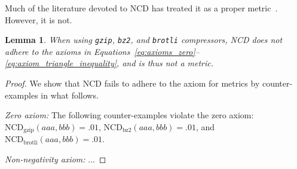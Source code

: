 \documentclass[preprint,12pt]{article}
\newtheorem{lemma}{Lemma}
\begin{document}

Much of the literature devoted to NCD has treated it as a proper metric~\cite{opitz2023gzip,weinreich2023parameter,nishida2011tweet,jiang2022less}. However, it is not.
\begin{lemma}
    When using \texttt{gzip}, \texttt{bz2}, and \texttt{brotli} compressors, NCD does not adhere to the axioms in Equations~\ref{eq:axioms_zero}--\ref{eq:axiom_triangle_inequality}, and is thus not a metric.
\end{lemma}
\begin{proof}
    We show that NCD fails to adhere to the axiom for metrics by counter-examples in what follows.

    \vspace{0.5em}
    \noindent%
    \textit{Zero axiom:} The following counter-examples violate the zero axiom:
    $\text{NCD}_{\text{gzip}}(aaa, bbb) = .01$, $\text{NCD}_{\text{bz2}}(aaa, bbb) = .01 $, and $\text{NCD}_{\text{brotli}}(aaa, bbb) = .01$.

    \vspace{0.5em}
    \noindent%
    \textit{Non-negativity axiom:} ...

\end{proof}










\end{document}
